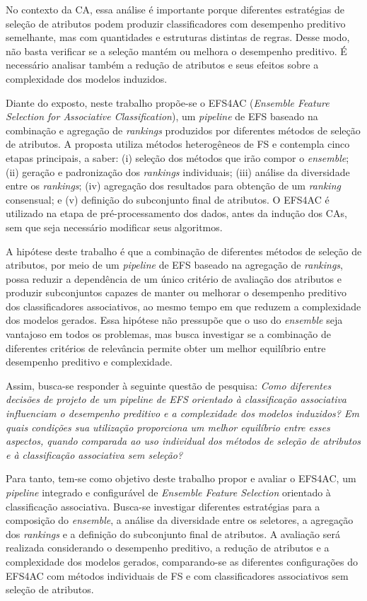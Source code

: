 No contexto da CA, essa análise é importante porque diferentes estratégias de seleção de atributos podem produzir classificadores com desempenho preditivo semelhante, mas com quantidades e estruturas distintas de regras. Desse modo, não basta verificar se a seleção mantém ou melhora o desempenho preditivo. É necessário analisar também a redução de atributos e seus efeitos sobre a complexidade dos modelos induzidos.

Diante do exposto, neste trabalho propõe-se o EFS4AC (\textit{Ensemble Feature Selection for Associative Classification}), um \textit{pipeline} de EFS baseado na combinação e agregação de \textit{rankings} produzidos por diferentes métodos de seleção de atributos. A proposta utiliza métodos heterogêneos de FS e contempla cinco etapas principais, a saber: (i) seleção dos métodos que irão compor o \textit{ensemble}; (ii) geração e padronização dos \textit{rankings} individuais; (iii) análise da diversidade entre os \textit{rankings}; (iv) agregação dos resultados para obtenção de um \textit{ranking} consensual; e (v) definição do subconjunto final de atributos. O EFS4AC é utilizado na etapa de pré-processamento dos dados, antes da indução dos CAs, sem que seja necessário modificar seus algoritmos.

A hipótese deste trabalho é que a combinação de diferentes métodos de seleção de atributos, por meio de um \textit{pipeline} de EFS baseado na agregação de \textit{rankings}, possa reduzir a dependência de um único critério de avaliação dos atributos e produzir subconjuntos capazes de manter ou melhorar o desempenho preditivo dos classificadores associativos, ao mesmo tempo em que reduzem a complexidade dos modelos gerados. Essa hipótese não pressupõe que o uso do \textit{ensemble} seja vantajoso em todos os problemas, mas busca investigar se a combinação de diferentes critérios de relevância permite obter um melhor equilíbrio entre desempenho preditivo e complexidade.

Assim, busca-se responder à seguinte questão de pesquisa: \textit{Como diferentes decisões de projeto de um pipeline de EFS orientado à classificação associativa influenciam o desempenho preditivo e a complexidade dos modelos induzidos? Em quais condições sua utilização proporciona um melhor equilíbrio entre esses aspectos, quando comparada ao uso individual dos métodos de seleção de atributos e à classificação associativa sem seleção?}

Para tanto, tem-se como objetivo deste trabalho propor e avaliar o EFS4AC, um \textit{pipeline} integrado e configurável de \textit{Ensemble Feature Selection} orientado à classificação associativa. Busca-se investigar diferentes estratégias para a composição do \textit{ensemble}, a análise da diversidade entre os seletores, a agregação dos \textit{rankings} e a definição do subconjunto final de atributos. A avaliação será realizada considerando o desempenho preditivo, a redução de atributos e a complexidade dos modelos gerados, comparando-se as diferentes configurações do EFS4AC com métodos individuais de FS e com classificadores associativos sem seleção de atributos.

